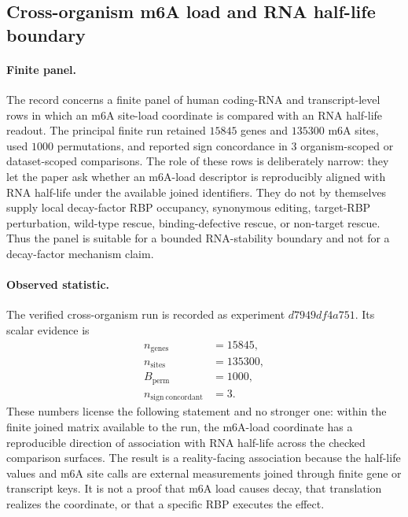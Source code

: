
\subsection{Cross-organism m6A load and RNA half-life boundary}
\label{sec:bioreality-m6a-load-halflife-crossorganism-human-m6aconquer}

\paragraph{Finite panel.}
The record concerns a finite panel of human coding-RNA and transcript-level rows in which an m6A site-load coordinate is compared with an RNA half-life readout.  The principal finite run retained $15845$ genes and $135300$ m6A sites, used $1000$ permutations, and reported sign concordance in $3$ organism-scoped or dataset-scoped comparisons.  The role of these rows is deliberately narrow: they let the paper ask whether an m6A-load descriptor is reproducibly aligned with RNA half-life under the available joined identifiers.  They do not by themselves supply local decay-factor RBP occupancy, synonymous editing, target-RBP perturbation, wild-type rescue, binding-defective rescue, or non-target rescue.  Thus the panel is suitable for a bounded RNA-stability boundary and not for a decay-factor mechanism claim.

\paragraph{Observed statistic.}
The verified cross-organism run is recorded as experiment $d7949df4a751$.  Its scalar evidence is
$$
\begin{aligned}
  n_{\mathrm{genes}} &= 15845,\\
  n_{\mathrm{sites}} &= 135300,\\
  B_{\mathrm{perm}} &= 1000,\\
  n_{\mathrm{sign\ concordant}} &= 3.
\end{aligned}
$$
These numbers license the following statement and no stronger one: within the finite joined matrix available to the run, the m6A-load coordinate has a reproducible direction of association with RNA half-life across the checked comparison surfaces.  The result is a reality-facing association because the half-life values and m6A site calls are external measurements joined through finite gene or transcript keys.  It is not a proof that m6A load causes decay, that translation realizes the coordinate, or that a specific RBP executes the effect.

